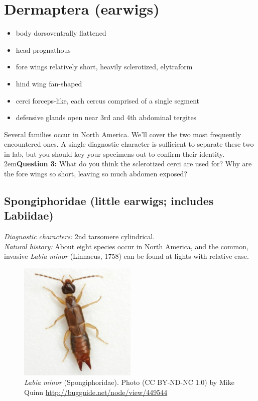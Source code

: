 \documentclass[letterpaper, 11pt]{article}
\begin{document}
\section{Dermaptera (earwigs)}
\begin{itemize}
\item body dorsoventrally flattened
\item head prognathous
\item fore wings relatively short, heavily sclerotized, elytraform
\item hind wing fan-shaped
\item cerci forceps-like, each cercus comprised of a single segment
\item defensive glands open near 3rd and 4th abdominal tergites
\end{itemize}
Several families occur in North America. We'll cover the two most frequently encountered ones. A single diagnostic character is sufficient to separate these two in lab, but you should key \citep{engelDerm} your specimens out to confirm their identity.\\

\hangindent2em\textbf{Question 3:} What do you think the sclerotized cerci are used for? Why are the fore wings so short, leaving so much abdomen exposed? \\

\subsection{Spongiphoridae (little earwigs; includes Labiidae)}
\noindent{}\textit{Diagnostic characters:} 2nd tarsomere cylindrical.\\

\noindent{}\textit{Natural history:} About eight species occur in North America, and the common, invasive \textit{Labia minor} (Linnaeus, 1758) can be found at lights with relative ease.\\

\begin{figure}[ht!]
  \centering
    \includegraphics[width=0.5\textwidth]{spongi}
  \caption{\textit{Labia minor} (Spongiphoridae). Photo (CC BY-ND-NC 1.0) by Mike Quinn \url{http://bugguide.net/node/view/449544}}
  \label{fig:spongi}
\end{figure}
\end{document}
